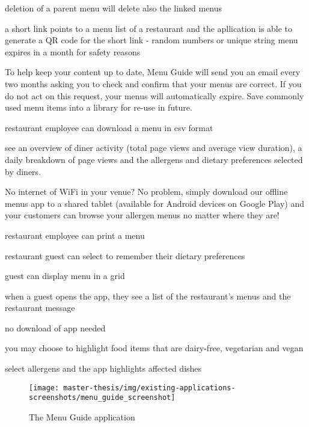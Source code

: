   deletion of a parent menu will delete also the linked menus

  a short link points to a menu list of a restaurant and the apllication is able to generate a QR code for the short link - random numbers or unique string
  menu expires in a month for safety reasons

  To help keep your content up to date, Menu Guide will send you an email every two months asking you
  to check and confirm that your menus are correct. If you do not act on this request, your menus will
  automatically expire.
  Save commonly used menu items into a library for re-use in future. 

  restaurant employee can download a menu in csv format 

  see an overview of diner
  activity (total page views and average view duration), a daily breakdown of page views and the allergens and dietary preferences selected by diners.

  No internet of WiFi in your venue? No problem, simply download our offline menus app to a shared tablet (available for Android devices on Google Play) and your customers can browse your allergen menus no matter where they are!

  restaurant employee can print a menu








  restaurant guest can select to remember their dietary preferences

  guest can display menu in a grid

  when a guest opens the app, they see a list of the restaurant's menus and the restaurant message

  no download of app needed

  you may choose to highlight food items that are dairy-free, vegetarian and vegan

  select allergens and the app highlights affected dishes

  \begin{figure}[h]
    \centering
    \texttt{[image: master-thesis/img/existing-applications-screenshots/menu\_guide\_screenshot]}
    \caption{The Menu Guide application}
  \end{figure}



